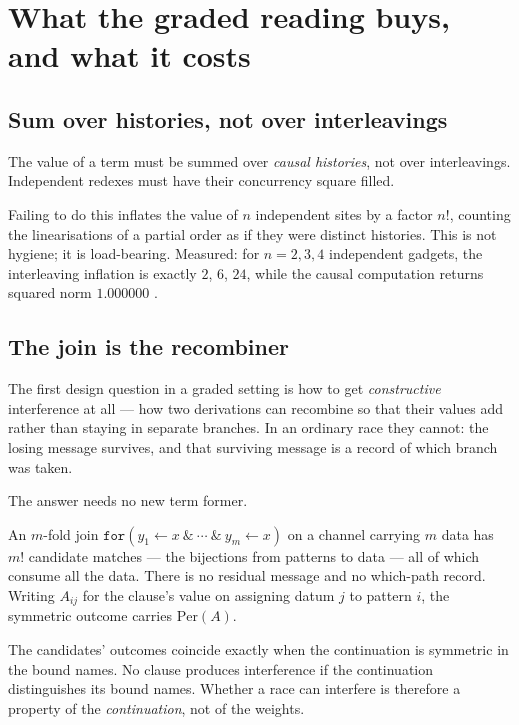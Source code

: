 \section{What the graded reading buys, and what it costs}
\label{sec:gradedbuys}

\subsection{Sum over histories, not over interleavings}

\begin{proposition}[Causality]
\label{prop:causal}
The value of a term must be summed over \emph{causal histories}, not over
interleavings. Independent redexes must have their concurrency square filled.
\end{proposition}

Failing to do this inflates the value of $n$ independent sites by a factor $n!$,
counting the linearisations of a partial order as if they were distinct histories.
This is not hygiene; it is load-bearing. Measured: for $n = 2,3,4$ independent
gadgets, the interleaving inflation is exactly $2$, $6$, $24$, while the causal
computation returns squared norm $1.000000$ \cite{GradedWhere}.

\subsection{The join is the recombiner}

The first design question in a graded setting is how to get \emph{constructive}
interference at all --- how two derivations can recombine so that their values add
rather than staying in separate branches. In an ordinary race they cannot: the
losing message survives, and that surviving message is a record of which branch
was taken.

The answer needs no new term former.

\begin{theorem}[Scattering]
\label{thm:scattering}
An $m$-fold join $\texttt{for}(y_{1} \leftarrow x\ \&\ \cdots\ \&\ y_{m}
\leftarrow x)$ on a channel carrying $m$ data has $m!$ candidate matches --- the
bijections from patterns to data --- all of which consume all the data. There is
no residual message and no which-path record. Writing $A_{ij}$ for the clause's
value on assigning datum $j$ to pattern $i$, the symmetric outcome carries
$\mathrm{Per}(A)$.
\end{theorem}

\begin{corollary}
\label{cor:whichpath}
The candidates' outcomes coincide exactly when the continuation is symmetric in
the bound names. No clause produces interference if the continuation distinguishes
its bound names. Whether a race can interfere is therefore a property of the
\emph{continuation}, not of the weights.
\end{corollary}

